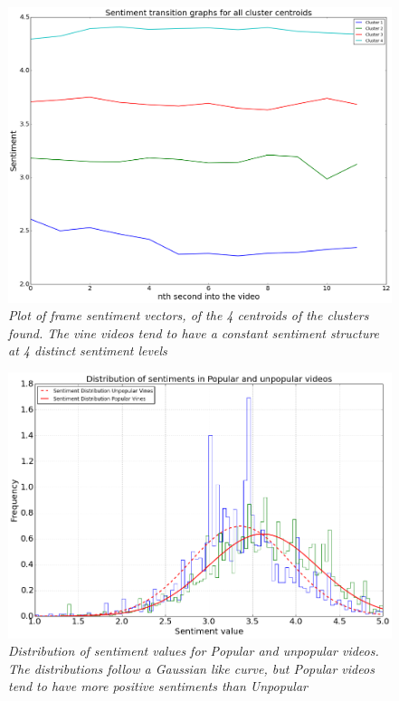 \begin{figure}[!htb]
\centering
\includegraphics[width=\columnwidth]{plots/4_cluster_senti}
\caption{\textsl{ Plot of frame sentiment vectors, of the 4 centroids of the clusters found. The vine videos  tend to have a constant sentiment structure at 4 distinct sentiment levels }}
\label{fig:Clusters}
\end{figure}

\begin{figure}[!htb]
\centering
\includegraphics[width=\columnwidth]{plots/DistributionSentiments}
\caption{\textsl{ Distribution of sentiment values for Popular and unpopular videos. The distributions follow a Gaussian like curve, but Popular videos tend to have more positive sentiments than Unpopular }}
\label{fig:Senti_distribution}
\end{figure}


